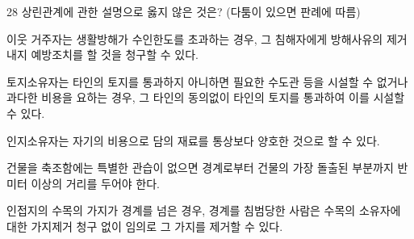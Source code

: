 \begin{question}{28}
상린관계에 관한 설명으로 옳지 않은 것은? (다툼이 있으면 판례에 따름)
\begin{choices}
  \item 이웃 거주자는 생활방해가 수인한도를 초과하는 경우, 그 침해자에게 방해사유의 제거 내지 예방조치를 할 것을 청구할 수 있다.
  \item 토지소유자는 타인의 토지를 통과하지 아니하면 필요한 수도관 등을 시설할 수 없거나 과다한 비용을 요하는 경우, 그 타인의 동의없이 타인의 토지를 통과하여 이를 시설할 수 있다.
  \item 인지소유자는 자기의 비용으로 담의 재료를 통상보다 양호한 것으로 할 수 있다.
  \item 건물을 축조함에는 특별한 관습이 없으면 경계로부터 건물의 가장 돌출된 부분까지 반미터 이상의 거리를 두어야 한다.
  \item 인접지의 수목의 가지가 경계를 넘은 경우, 경계를 침범당한 사람은 수목의 소유자에 대한 가지제거 청구 없이 임의로 그 가지를 제거할 수 있다.
\end{choices}
\end{question}

